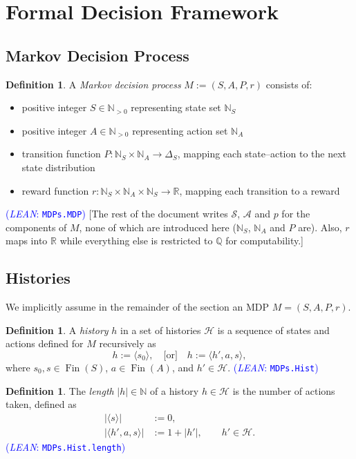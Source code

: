 \documentclass[letterpaper]{article}
\theoremstyle{plain}
\theoremstyle{definition}
\newtheorem{definition}[theorem]{Definition}
\theoremstyle{remark}
\newcommand{\Nats}{\mathbb{N}}
\newcommand{\Real}{\mathbb{R}}
\newcommand{\why}[1]{\text{[#1]}}
\newcommand{\cc}[1]{\textcolor{ccolor}{[#1]}}
\newcommand{\lean}[1]{\textcolor{blue}{(\emph{LEAN}: \texttt{#1})}}
\newcommand{\leanok}{}
\begin{document}
\section{Formal Decision Framework}

\subsection{Markov Decision Process}

\newcommand{\Fin}{\operatorname{Fin}}

\begin{definition} \label{def:MDP}
A \emph{Markov decision process} $M := (S, A, P, r)$ consists of:
\begin{itemize}
  \item positive integer $S \in \Nats_{>0}$ representing state set $\Nats_S$
  \item positive integer $A \in \Nats_{>0}$ representing action set $\Nats_A$
  \item transition function $P \colon \Nats_S \times \Nats_A \to \Delta_S$, mapping each state–action to the next state distribution
  \item reward function $r \colon \Nats_S \times \Nats_A \times \Nats_S \to \Real$, mapping each transition to a reward
\end{itemize}
\lean{MDPs.MDP} \leanok
\cc{The rest of the document writes $\mathcal{S}$, $\mathcal{A}$ and $p$ for the components of $M$, none of which are introduced here ($\Nats_S$, $\Nats_A$ and $P$ are). Also, $r$ maps into $\Real$ while everything else is restricted to $\mathbb{Q}$ for computability.}
\end{definition}

\subsection{Histories}

We implicitly assume in the remainder of the section an MDP $M = (S, A, P, r)$.
\begin{definition} \label{def:Hist}
A \emph{history} $h$ in a set of histories $\mathcal{H}$ is a sequence of states and actions defined for $M$ recursively as
\[
  h := \langle s_0 \rangle, \quad
  \why{or} \quad
  h := \langle h', a, s \rangle,
\]
where $s_0, s \in \Fin(S)$, $a \in \Fin(A)$, and $h'\in \mathcal{H}$.
\lean{MDPs.Hist} \leanok
\end{definition}

\begin{definition} \label{def:hist-length}
The \emph{length} $|h|\in  \Nats$ of a history $h\in \mathcal{H}$ is the number of actions taken, defined as
\begin{align*}
|\langle s \rangle| &:= 0, \\
|\langle h', a, s \rangle| &:= 1 + |h'|, \qquad h' \in \mathcal{H}.
\end{align*}
\lean{MDPs.Hist.length} \leanok
\end{definition}
\end{document}
